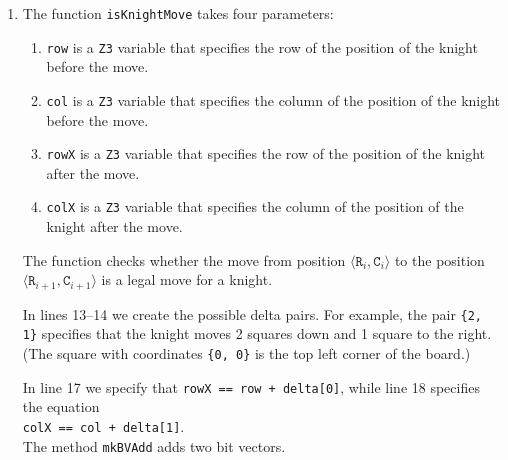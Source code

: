 \begin{enumerate}
\item The function \texttt{isKnightMove} takes four parameters:
      \begin{enumerate}
      \item \texttt{row} is a \texttt{Z3} variable that specifies the row of the position of the knight before
            the move. 
      \item \texttt{col} is a \texttt{Z3} variable that specifies the column of the position of the knight
            before the move. 
      \item \texttt{rowX} is a \texttt{Z3} variable that specifies the row of the position of the knight after
            the move. 
      \item \texttt{colX} is a \texttt{Z3} variable that specifies the column of the position of the knight
            after the move. 
      \end{enumerate}
      The function checks whether the move from position 
      $\langle \mathtt{R}_i, \mathtt{C}_i \rangle$ to the position $\langle \mathtt{R}_{i+1}, \mathtt{C}_{i+1} \rangle$
      is a legal move for a knight.

      In lines 13--14 we create the possible delta pairs.  For example, the pair \texttt{\{2, 1\}} specifies that
      the knight moves 2 squares down and 1 square to the right.
      (The square with coordinates  \texttt{\{0, 0\}} is the top left corner of the board.)

      In line 17 we specify that \texttt{rowX == row + delta[0]}, while line 18 specifies the equation
      \\[0.2cm]
      \hspace*{1.3cm}
      \texttt{colX == col + delta[1]}.
      \\[0.2cm]
      The method \texttt{mkBVAdd} adds two bit vectors.
      

\end{enumerate}

